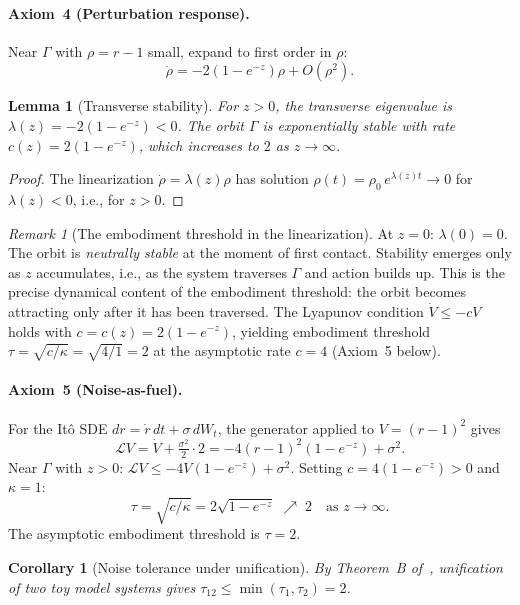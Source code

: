 \documentclass[12pt, oneside]{book}
\theoremstyle{plain}
\newtheorem{lemma}[theorem]{Lemma}
\newtheorem{corollary}[theorem]{Corollary}
\theoremstyle{definition}
\theoremstyle{remark}
\newtheorem{remark}{Remark}[section]
\newcommand{\Orb}{\Gamma}
\begin{document}
\paragraph{Axiom~4 (Perturbation response).}
Near $\Orb$ with $\rho=r-1$ small, expand to first order in $\rho$:
\[
  \dot\rho = -2(1-e^{-z})\rho + O(\rho^2).
\]

\begin{lemma}[Transverse stability]\label{lem:transverse}
For $z>0$, the transverse eigenvalue is
$\lambda(z) = -2(1-e^{-z}) < 0$.
The orbit $\Orb$ is exponentially stable with rate
$c(z) = 2(1-e^{-z})$, which increases to $2$ as $z\to\infty$.
\end{lemma}

\begin{proof}
The linearization $\dot\rho = \lambda(z)\rho$ has solution
$\rho(t) = \rho_0\,e^{\lambda(z)t}\to 0$ for $\lambda(z)<0$,
i.e., for $z>0$.
\end{proof}

\begin{remark}[The embodiment threshold in the linearization]
At $z=0$: $\lambda(0) = 0$. The orbit is \emph{neutrally stable}
at the moment of first contact. Stability emerges only as $z$
accumulates, i.e., as the system traverses $\Orb$ and action
builds up. This is the precise dynamical content of the embodiment
threshold: the orbit becomes attracting only after it has been
traversed. The Lyapunov condition $\dot V\le -cV$ holds with
$c = c(z) = 2(1-e^{-z})$, yielding embodiment threshold
$\tau = \sqrt{c/\kappa} = \sqrt{4/1} = 2$ at the asymptotic
rate $c=4$ (Axiom~5 below).
\end{remark}

\paragraph{Axiom~5 (Noise-as-fuel).}
For the It\^o SDE $dr = \dot r\,dt + \sigma\,dW_t$, the generator
applied to $V=(r-1)^2$ gives
\[
  \mathcal{L}V = \dot V + \tfrac{\sigma^2}{2}\cdot 2
  = -4(r-1)^2(1-e^{-z}) + \sigma^2.
\]
Near $\Orb$ with $z>0$: $\mathcal{L}V \le -4V(1-e^{-z}) + \sigma^2$.
Setting $c=4(1-e^{-z})>0$ and $\kappa=1$:
\[
  \tau = \sqrt{c/\kappa} = 2\sqrt{1-e^{-z}}\;\nearrow\; 2
  \quad\text{as }z\to\infty.
\]
The asymptotic embodiment threshold is $\tau=2$.

\begin{corollary}[Noise tolerance under unification]
By Theorem~B of~\cite{Paper1}, unification of two toy model
systems gives $\tau_{12}\le\min(\tau_1,\tau_2)=2$.
\end{corollary}
\end{document}
